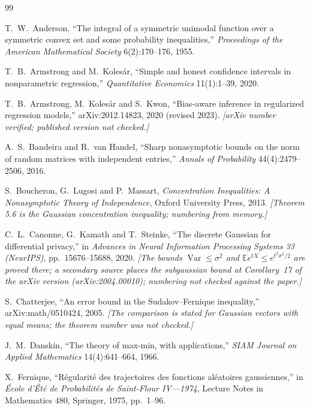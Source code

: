\documentclass[11pt]{article}
\theoremstyle{definition}
\theoremstyle{plain}
\newcommand{\Ex}{\mathbb{E}}
\DeclareMathOperator{\Var}{Var}
\begin{document}
\begin{thebibliography}{99}

T.~W.~Anderson, ``The integral of a symmetric unimodal function over a symmetric convex set and some probability inequalities,'' \textit{Proceedings of the American Mathematical Society} 6(2):170--176, 1955.

T.~B.~Armstrong and M.~Kolesár, ``Simple and honest confidence intervals in nonparametric regression,'' \textit{Quantitative Economics} 11(1):1--39, 2020.

T.~B.~Armstrong, M.~Kolesár and S.~Kwon, ``Bias-aware inference in regularized regression models,'' arXiv:2012.14823, 2020 (revised 2023). \emph{[arXiv number verified; published version not checked.]}

A.~S.~Bandeira and R.~van Handel, ``Sharp nonasymptotic bounds on the norm of random matrices with independent entries,'' \textit{Annals of Probability} 44(4):2479--2506, 2016.

S.~Boucheron, G.~Lugosi and P.~Massart, \textit{Concentration Inequalities: A Nonasymptotic Theory of Independence}, Oxford University Press, 2013. \emph{[Theorem 5.6 is the Gaussian concentration inequality; numbering from memory.]}

C.~L.~Canonne, G.~Kamath and T.~Steinke, ``The discrete Gaussian for differential privacy,'' in \textit{Advances in Neural Information Processing Systems 33 (NeurIPS)}, pp.~15676--15688, 2020. \emph{[The bounds $\Var\le\sigma^2$ and $\Ex e^{tX}\le e^{t^2\sigma^2/2}$ are proved there; a secondary source places the subgaussian bound at Corollary~17 of the arXiv version (arXiv:2004.00010); numbering not checked against the paper.]}

S.~Chatterjee, ``An error bound in the Sudakov--Fernique inequality,'' arXiv:math/0510424, 2005. \emph{[The comparison is stated for Gaussian vectors with equal means; the theorem number was not checked.]}

J.~M.~Danskin, ``The theory of max-min, with applications,'' \textit{SIAM Journal on Applied Mathematics} 14(4):641--664, 1966.

X.~Fernique, ``Régularité des trajectoires des fonctions aléatoires gaussiennes,'' in \textit{École d'Été de Probabilités de Saint-Flour IV---1974}, Lecture Notes in Mathematics 480, Springer, 1975, pp.~1--96.


\end{thebibliography}
\end{document}
